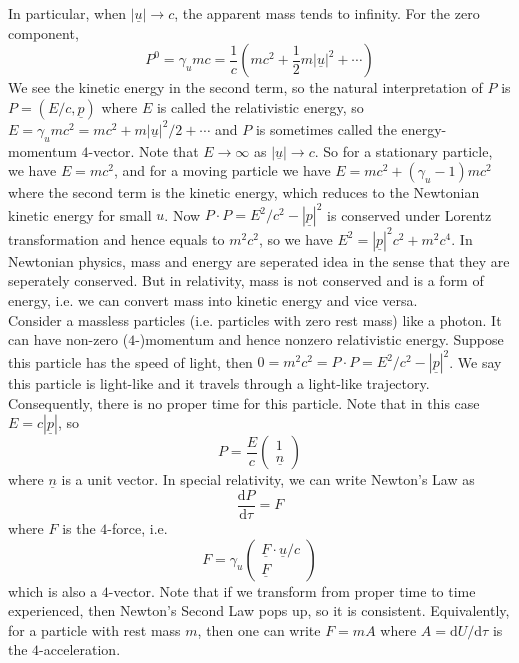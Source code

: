 In particular, when $|\underline{u}|\to c$, the apparent mass tends to infinity.
For the zero component,
$$P^0=\gamma_umc=\frac{1}{c}\left(mc^2+\frac{1}{2}m|\underline{u}|^2+\cdots\right)$$
We see the kinetic energy in the second term, so the natural interpretation of $P$ is $P=(E/c,\underline{p})$ where $E$ is called the relativistic energy, so $E=\gamma_umc^2=mc^2+m|\underline{u}|^2/2+\cdots$ and $P$ is sometimes called the energy-momentum $4$-vector.
Note that $E\to\infty$ as $|\underline{u}|\to c$.
So for a stationary particle, we have $E=mc^2$, and for a moving particle we have $E=mc^2+(\gamma_u-1)mc^2$ where the second term is the kinetic energy, which reduces to the Newtonian kinetic energy for small $u$.
Now $P\cdot P=E^2/c^2-|\underline{p}|^2$ is conserved under Lorentz transformation and hence equals to $m^2c^2$, so we have $E^2=|\underline{p}|^2c^2+m^2c^4$.
In Newtonian physics, mass and energy are seperated idea in the sense that they are seperately conserved.
But in relativity, mass is not conserved and is a form of energy, i.e. we can convert mass into kinetic energy and vice versa.\\
Consider a massless particles (i.e. particles with zero rest mass) like a photon.
It can have non-zero ($4$-)momentum and hence nonzero relativistic energy.
Suppose this particle has the speed of light, then $0=m^2c^2=P\cdot P=E^2/c^2-|\underline{p}|^2$.
We say this particle is light-like and it travels through a light-like trajectory.
Consequently, there is no proper time for this particle.
Note that in this case $E=c|\underline{p}|$, so
$$P=\frac{E}{c}\begin{pmatrix}
    1\\
    \underline{n}
\end{pmatrix}$$
where $\underline{n}$ is a unit vector.
In special relativity, we can write Newton's Law as
$$\frac{\mathrm dP}{\mathrm d\tau}=F$$
where $F$ is the $4$-force, i.e.
$$F=\gamma_u\begin{pmatrix}
    \underline{F}\cdot\underline{u}/c\\
    \underline{F}
\end{pmatrix}$$
which is also a $4$-vector.
Note that if we transform from proper time to time experienced, then Newton's Second Law pops up, so it is consistent.
Equivalently, for a particle with rest mass $m$, then one can write $F=mA$ where $A=\mathrm dU/\mathrm d\tau$ is the $4$-acceleration.

